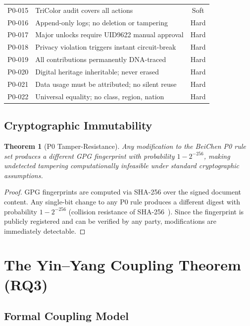 \documentclass[conference]{IEEEtran}
\newtheorem{theorem}{Theorem}
\begin{document}
\begin{table}[t]
\begin{tabular}{clc}
P0-015 & TriColor audit covers all actions
  & Soft \\
P0-016 & Append-only logs; no deletion or tampering
  & Hard \\
P0-017 & Major unlocks require UID9622 manual approval
  & Hard \\
P0-018 & Privacy violation triggers instant circuit-break
  & Hard \\
P0-019 & All contributions permanently DNA-traced
  & Hard \\
P0-020 & Digital heritage inheritable; never erased
  & Hard \\
P0-021 & Data usage must be attributed; no silent reuse
  & Hard \\
P0-022 & Universal equality; no class, region, nation
  & Hard \\
\bottomrule
\end{tabular}
\end{table}

\subsection{Cryptographic Immutability}

\begin{theorem}[P0 Tamper-Resistance]
Any modification to the BeiChen P0 rule set produces a different
GPG fingerprint with probability $1 - 2^{-256}$, making
undetected tampering computationally infeasible under
standard cryptographic assumptions.
\end{theorem}

\begin{proof}
GPG fingerprints are computed via SHA-256 over the signed
document content.
Any single-bit change to any P0 rule produces a different
digest with probability $1 - 2^{-256}$
(collision resistance of SHA-256~\cite{FIPS2015}).
Since the fingerprint is publicly registered and can be
verified by any party, modifications are immediately detectable.
\end{proof}

\section{The Yin--Yang Coupling Theorem (RQ3)}

\subsection{Formal Coupling Model}
\end{document}
